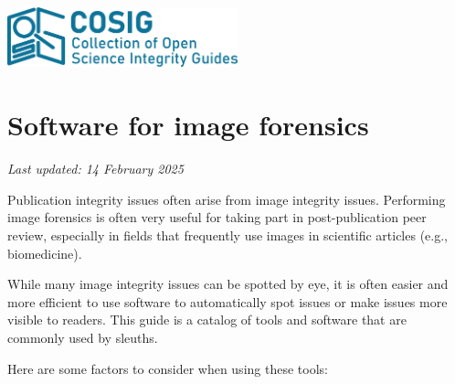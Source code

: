 \documentclass[letterpaper, 12pt]{article}
\begin{document}
\flushleft
\includegraphics[width=0.5\textwidth]{img/home/241017_final_logo_mockup.png}

\section*{Software for image forensics}
\textit{Last updated: 14 February 2025}

Publication integrity issues often arise from image integrity issues. Performing image forensics is often very useful for taking part in post-publication peer review, especially in fields that frequently use images in scientific articles (e.g., biomedicine).

While many image integrity issues can be spotted by eye, it is often easier and more efficient to use software to automatically spot issues or make issues more visible to readers. This guide is a catalog of tools and software that are commonly used by sleuths.

Here are some factors to consider when using these tools:
\end{document}
